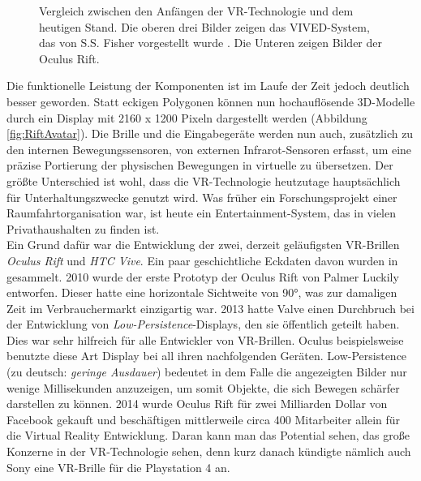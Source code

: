 \begin{figure}%
    \centering
    \qquad
    \qquad
    \qquad
    \qquad
    \qquad
    \caption{Vergleich zwischen den Anfängen der VR-Technologie und dem heutigen Stand. Die oberen drei Bilder zeigen das VIVED-System, das von S.S. Fisher vorgestellt wurde \cite{bib:NasaVr}. Die Unteren zeigen Bilder der Oculus Rift.}\label{fig:VIVED}%
\end{figure}

Die funktionelle Leistung der Komponenten ist im Laufe der Zeit jedoch deutlich besser geworden. Statt eckigen Polygonen können nun hochauflösende 3D-Modelle durch ein Display mit 2160 x 1200 Pixeln dargestellt werden (Abbildung \ref{fig:RiftAvatar}). Die Brille und die Eingabegeräte werden nun auch, zusätzlich zu den internen Bewegungssensoren, von externen Infrarot-Sensoren erfasst, um eine präzise Portierung der physischen Bewegungen in virtuelle zu übersetzen. Der größte Unterschied ist wohl, dass die VR-Technologie heutzutage hauptsächlich für Unterhaltungszwecke genutzt wird. Was früher ein Forschungsprojekt einer Raumfahrtorganisation war, ist heute ein Entertainment-System, das in vielen Privathaushalten zu finden ist.\\

Ein Grund dafür war die Entwicklung der zwei, derzeit geläufigsten VR-Brillen \textit{Oculus Rift} und \textit{HTC Vive}. Ein paar geschichtliche Eckdaten davon wurden in \cite{bib:RiftHistorical} gesammelt. 2010 wurde der erste Prototyp der Oculus Rift von Palmer Luckily entworfen. Dieser hatte eine horizontale Sichtweite von 90°, was zur damaligen Zeit im Verbrauchermarkt einzigartig war. 2013 hatte Valve einen Durchbruch bei der Entwicklung von \textit{Low-Persistence}-Displays, den sie öffentlich geteilt haben. Dies war sehr hilfreich für alle Entwickler von VR-Brillen. Oculus beispielsweise benutzte diese Art Display bei all ihren nachfolgenden Geräten. Low-Persistence (zu deutsch: \textit{geringe Ausdauer}) bedeutet in dem Falle die angezeigten Bilder nur wenige Millisekunden anzuzeigen, um somit Objekte, die sich Bewegen schärfer darstellen zu können. 2014 wurde Oculus Rift für zwei Milliarden Dollar von Facebook gekauft und beschäftigen mittlerweile circa 400 Mitarbeiter allein für die Virtual Reality Entwicklung. Daran kann man das Potential sehen, das große Konzerne in der VR-Technologie sehen, denn kurz danach kündigte nämlich auch Sony eine VR-Brille für die Playstation 4 an.\\

